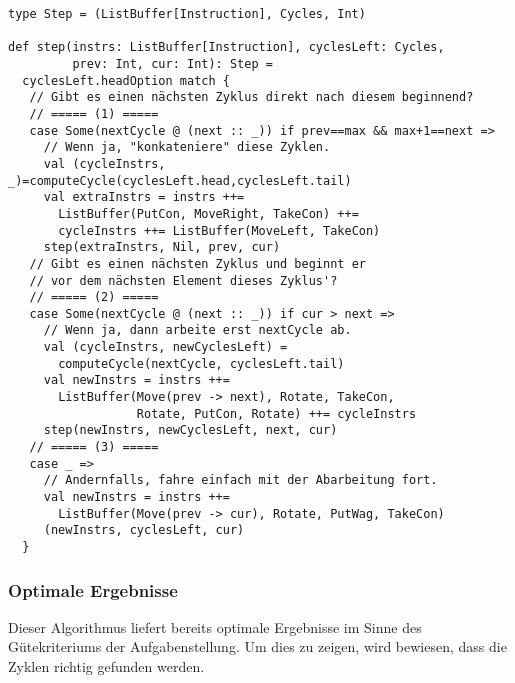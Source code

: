 \begin{lstlisting}
type Step = (ListBuffer[Instruction], Cycles, Int)

def step(instrs: ListBuffer[Instruction], cyclesLeft: Cycles,
         prev: Int, cur: Int): Step =
  cyclesLeft.headOption match {
   // Gibt es einen nächsten Zyklus direkt nach diesem beginnend?
   // ===== (1) =====
   case Some(nextCycle @ (next :: _)) if prev==max && max+1==next =>
     // Wenn ja, "konkateniere" diese Zyklen.
     val (cycleInstrs, _)=computeCycle(cyclesLeft.head,cyclesLeft.tail)
     val extraInstrs = instrs ++=
       ListBuffer(PutCon, MoveRight, TakeCon) ++=
       cycleInstrs ++= ListBuffer(MoveLeft, TakeCon)
     step(extraInstrs, Nil, prev, cur)
   // Gibt es einen nächsten Zyklus und beginnt er
   // vor dem nächsten Element dieses Zyklus'?
   // ===== (2) =====
   case Some(nextCycle @ (next :: _)) if cur > next =>
     // Wenn ja, dann arbeite erst nextCycle ab.
     val (cycleInstrs, newCyclesLeft) =
       computeCycle(nextCycle, cyclesLeft.tail)
     val newInstrs = instrs ++=
       ListBuffer(Move(prev -> next), Rotate, TakeCon,
                  Rotate, PutCon, Rotate) ++= cycleInstrs
     step(newInstrs, newCyclesLeft, next, cur)
   // ===== (3) =====
   case _ =>
     // Andernfalls, fahre einfach mit der Abarbeitung fort.
     val newInstrs = instrs ++=
       ListBuffer(Move(prev -> cur), Rotate, PutWag, TakeCon)
     (newInstrs, cyclesLeft, cur)
  }
\end{lstlisting}
\lstset{basicstyle=\ttfamily}

\subsubsection{Optimale Ergebnisse}
\label{opt_res}
Dieser Algorithmus liefert bereits optimale Ergebnisse im Sinne des Güte\-kri\-ter\-iums der Aufgabenstellung.
Um dies zu zeigen, wird bewiesen, dass die Zyklen richtig gefunden werden.
